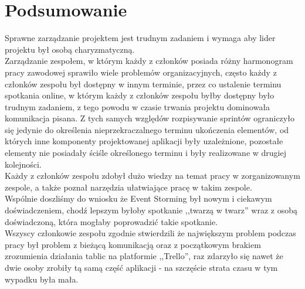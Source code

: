 \documentclass[12pt,a4paper]{article}
\begin{document}
	\section{Podsumowanie}
		\indent Sprawne zarządzanie projektem jest trudnym zadaniem i wymaga aby lider projektu był osobą charyzmatyczną.\\
		\indent Zarządzanie zespołem, w którym każdy z członków
		posiada różny harmonogram pracy zawodowej sprawiło wiele problemów organizacyjnych, często każdy z członków zespołu był dostępny w innym terminie,
		przez co ustalenie terminu spotkania online, w którym każdy z członków zespołu byłby dostępny było trudnym zadaniem, z tego powodu w czasie trwania projektu dominowała
		komunikacja pisana. Z tych samych względów rozpisywanie sprintów ograniczyło się jedynie do określenia nieprzekraczalnego terminu ukończenia elementów, od których inne
		komponenty projektowanej aplikacji były uzależnione, pozostałe elementy nie posiadały ściśle określonego terminu i były realizowane w drugiej kolejności.\\
		\indent Każdy z członków zespołu zdobył dużo wiedzy na temat pracy w zorganizowanym zespole, a także poznał narzędzia ułatwiające pracę w takim zespole.\\
		\indent Wspólnie doszliśmy do wniosku że Event Storming był nowym i  ciekawym doświadczeniem, chodź lepszym byłoby spotkanie ,,twarzą w twarz''
		wraz z osobą doświadczoną, która mogłaby poprowadzić takie spotkanie.\\
		\indent Wszyscy członkowie zespołu zgodnie stwierdzili że największym problem podczas pracy był problem z bieżącą komunikacją oraz z początkowym brakiem zrozumienia działania
		tablic na platformie ,,Trello'', raz zdarzyło się nawet	że dwie osoby zrobiły tą samą część aplikacji - na szczęście strata czasu w tym wypadku była mała. 	
\end{document}

